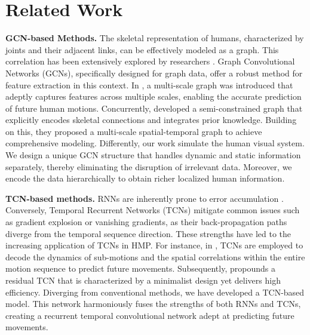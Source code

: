 \section{Related Work}
\textbf{GCN-based Methods.}\quad
The skeletal representation of humans, characterized by joints and their adjacent links, can be effectively modeled as a graph. This correlation has been extensively explored by researchers \cite{LTD,HRI,yao2024swift}. Graph Convolutional Networks (GCNs), specifically designed for graph data, offer a robust method for feature extraction in this context.
In \cite{DMGNN,SKEL}, a multi-scale graph was introduced that adeptly captures features across multiple scales, enabling the accurate prediction of future human motions. Concurrently, \cite{DBLP:conf/iccv/LiuS0SCH021} developed a semi-constrained graph that explicitly encodes skeletal connections and integrates prior knowledge. Building on this, they proposed a multi-scale spatial-temporal graph \cite{MSGNN} to achieve comprehensive modeling.
Differently, our work simulate the human visual system. We design a unique GCN structure that handles dynamic and static information separately, thereby eliminating the disruption of irrelevant data. Moreover, we encode the data hierarchically to obtain richer localized human information.

\textbf{TCN-based methods.} \quad
RNNs are inherently prone to error accumulation \cite{QN,SGRU,MM23_deepfake}. Conversely, Temporal Recurrent Networks (TCNs) mitigate common issues such as gradient explosion or vanishing gradients, as their back-propagation paths diverge from the temporal sequence direction. These strengths have led to the increasing application of TCNs in HMP.  
For instance, in \cite{MoP}, TCNs are employed to decode the dynamics of sub-motions and the spatial correlations within the entire motion sequence to predict future movements. Subsequently, \cite{TCGAN} propounds a residual TCN that is characterized by a minimalist design yet delivers high efficiency.
Diverging from conventional methods, we have developed a TCN-based model. This network harmoniously fuses the strengths of both RNNs and TCNs, creating a recurrent temporal convolutional network adept at predicting future movements. 

